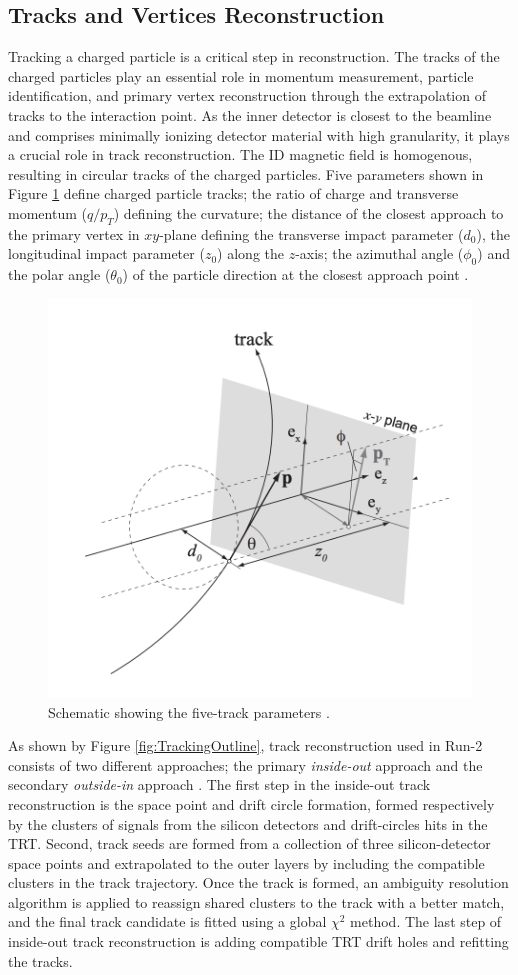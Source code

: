 \subsection{Tracks and Vertices Reconstruction}
\label{subsec:Tracking}
Tracking a charged particle is a critical step in reconstruction. The tracks of the charged particles play an essential role in momentum measurement, particle identification, and primary vertex reconstruction through the extrapolation of tracks to the interaction point. As the inner detector is closest to the beamline and comprises minimally ionizing detector material with high granularity, it plays a crucial role in track reconstruction. The ID magnetic field is homogenous, resulting in circular tracks of the charged particles. Five parameters shown in Figure \ref{fig:TrackParameter} define charged particle tracks; the ratio of charge and transverse momentum ($q/p_{T}$) defining the curvature; the distance of the closest approach to the primary vertex in $xy$-plane defining the transverse impact parameter ($d_{0}$), the longitudinal impact parameter ($z_{0}$) along the $z$-axis; the azimuthal angle ($\phi_{0}$) and the polar angle ($\theta_{0}$) of the particle direction at the closest approach point \cite{TrackingRun2_ATLAS}. 

\begin{figure}[!htb]
    \centering
    \includegraphics[width=.6\linewidth]{figures/LHC/TrackParameters.png}
    \caption{ Schematic showing the five-track parameters \cite{TrackParameterFig}.\label{fig:TrackParameter}}
\end{figure}

As shown by Figure \ref{fig:TrackingOutline}, track reconstruction used in Run-2 consists of two different approaches; the primary \textit{inside-out} approach and the secondary \textit{outside-in} approach \cite{TrackingRun2_ATLAS}. The first step in the inside-out track reconstruction is the space point and drift circle formation, formed respectively by the clusters of signals from the silicon detectors and drift-circles hits in the TRT. Second, track seeds are formed from a collection of three silicon-detector space points and extrapolated to the outer layers by including the compatible clusters in the track trajectory. Once the track is formed, an ambiguity resolution algorithm is applied to reassign shared clusters to the track with a better match, and the final track candidate is fitted using a global $\chi^{2}$ method. The last step of inside-out track reconstruction is adding compatible TRT drift holes and refitting the tracks. 

